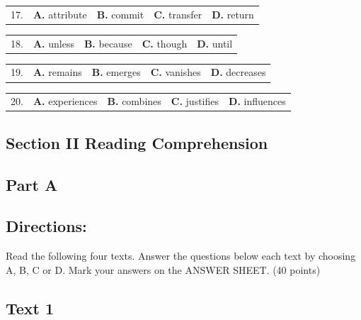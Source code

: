 \documentclass[UTF8,11pt]{ctexart}
\begin{document}
\noindent\begin{tabularx}{\linewidth}{@{}lXXXX@{}}17. & \textbf{A.} attribute & \textbf{B.} commit & \textbf{C.} transfer & \textbf{D.} return\\\end{tabularx}\par

\noindent\begin{tabularx}{\linewidth}{@{}lXXXX@{}}18. & \textbf{A.} unless & \textbf{B.} because & \textbf{C.} though & \textbf{D.} until\\\end{tabularx}\par

\noindent\begin{tabularx}{\linewidth}{@{}lXXXX@{}}19. & \textbf{A.} remains & \textbf{B.} emerges & \textbf{C.} vanishes & \textbf{D.} decreases\\\end{tabularx}\par

\noindent\begin{tabularx}{\linewidth}{@{}lXXXX@{}}20. & \textbf{A.} experiences & \textbf{B.} combines & \textbf{C.} justifies & \textbf{D.} influences\\\end{tabularx}\par

\subsection*{\textbf{Section II Reading Comprehension}}


\subsection*{\textbf{Part A}}


\subsection*{\textbf{Directions:}}


Read the following four texts. Answer the questions below each text by choosing A, B, C or D. Mark your answers on the ANSWER SHEET. (40 points)


\subsection*{\textbf{Text 1}}
\end{document}
